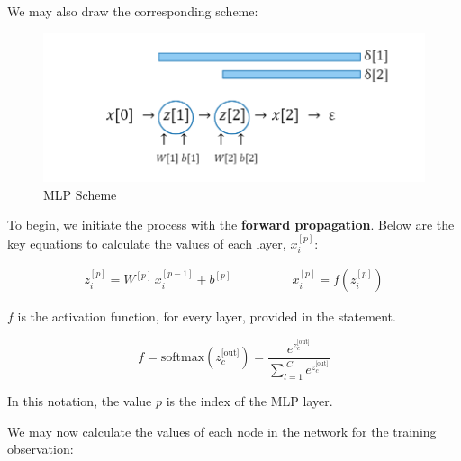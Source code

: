 \documentclass[12pt]{article}
\begin{document}
\begin{enumerate}
\vspace{10pt}
We may also draw the corresponding scheme:
\begin{figure}[H]
    \centering
    \includegraphics[width=14cm]{./Part I/Scheme.png}
    \caption{MLP Scheme}
\end{figure}

To begin, we initiate the process with the \textbf{forward propagation}. Below are the key equations to calculate the values of each
layer, $x^{[p]}_i$:

\begin{align*}
z^{[p]}_i = W^{[p]} \, x^{[p-1]}_i + b^{[p]} & \qquad\qquad
x^{[p]}_i = f\left(z^{[p]}_i\right)
\end{align*}

$f$ is the activation function, for every layer, provided in the statement.

\begin{equation*}
    f = \text{softmax}(z_c^\text{[out]}) = \frac{e^{z_c^\text{[out]}}}{\sum_{l=1}^{|C|} e^{z_c^\text{[out]}}}
\end{equation*}

\vspace{10pt}
In this notation, the value $p$ is the index of the MLP layer.


We may now calculate the values of each node in the network for the training observation:


\end{enumerate}
\end{document}
